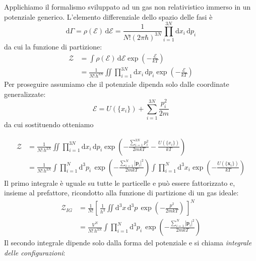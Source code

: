 \documentclass[a4paper]{report}
\begin{document}
Applichiamo il formalismo sviluppato ad un gas non relativistico immerso in un potenziale generico. L'elemento differenziale dello spazio delle fasi è
\begin{equation}
    \mathrm{d}\Gamma = \rho(\mathcal{E})\,\mathrm{d}\mathcal{E} = \frac{1}{N!(2\pi\hbar)^{3N}} \prod_{i=1}^{3N} \mathrm{d}x_i\,\mathrm{d}p_i 
\end{equation}
da cui la funzione di partizione:
\begin{equation}
    \begin{split}
        \mathcal{Z} & = \int \rho(\mathcal{E}) \, \mathrm{d}\mathcal{E} \exp\left(-\frac{\mathcal{E}}{k T}\right) \\
        & = \frac{1}{N!\,h^{3N}} \iint \prod_{i=1}^{3N} \mathrm{d}x_i\, \mathrm{d}p_i  \exp\left(-\frac{\mathcal{E}}{k T}\right) 
    \end{split}
\end{equation}
Per proseguire assumiamo che il potenziale dipenda solo dalle coordinate generalizzate:
\begin{equation}
    \mathcal{E} = U(\{x_i\}) + \sum_{i=1}^{3N}\frac{p_i^2}{2m}
\end{equation}
da cui sostituendo otteniamo

\begin{equation}
\begin{split}
    \mathcal{Z} & = \frac{1}{N!\,h^{3N}} \iint \prod_{i=1}^{3N} \mathrm{d}x_i\, \mathrm{d}p_i  \exp\left(-\frac{\sum_{i=1}^{3N}  p_i^2}{2 m k T} - \frac{U(\{x_i\})}{k T}\right)\\
    & = \frac{1}{N!\,h^{3N}} \int \prod_{i=1}^{N} \mathrm{d}^3 p_i\, 
    \exp\left(-\frac{\sum_{i=1}^{N}  |\mathbf{p}_i|^2}{2 m k T}\right) \int \prod_{i=1}^{N} \mathrm{d}^3 x_i \exp\left(-\frac{U(\{\mathbf{x}_i\})}{k T}\right)
\end{split}
\end{equation}
Il primo integrale è uguale su tutte le particelle e può essere fattorizzato e, insieme al prefattore, ricondotto alla funzione di partizione di un gas ideale:
\begin{equation}
    \begin{split}
        \mathcal{Z}_{IG} & = \frac{1}{N!}\left[\,\frac{1}{h^3} \iint \mathrm{d}^3 x \,\mathrm{d}^3 p\,\exp \left(-\frac{p^2}{2 m k T}\right)\,\right]^N \\
        & = \frac{V^N}{N!\,h^{3N}} \int \prod_{i=1}^{N} \mathrm{d}^3 p_i\, 
    \exp\left(-\frac{\sum_{i=1}^{N}  |\mathbf{p}_i|^2}{2 m k T}\right) 
    \end{split}
\end{equation}
Il secondo integrale dipende solo dalla forma del potenziale e si chiama \textit{integrale delle configurazioni}:
\end{document}
